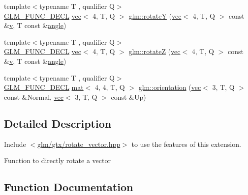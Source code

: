 \begin{DoxyCompactItemize}
\item 
{\footnotesize template$<$typename T , qualifier Q$>$ }\\\hyperlink{setup_8hpp_ab2d052de21a70539923e9bcbf6e83a51}{G\+L\+M\+\_\+\+F\+U\+N\+C\+\_\+\+D\+E\+CL} \hyperlink{structglm_1_1vec}{vec}$<$ 4, T, Q $>$ \hyperlink{group__gtx__rotate__vector_ga3ce3db0867b7f8efd878ee34f95a623b}{glm\+::rotateY} (\hyperlink{structglm_1_1vec}{vec}$<$ 4, T, Q $>$ const \&\hyperlink{_s_d_l__opengl_8h_a10a82eabcb59d2fcd74acee063775f90}{v}, T const \&\hyperlink{_s_d_l__opengl__glext_8h_a9e06c1f76a20fed54ca742cd25cb02c4}{angle})
\item 
{\footnotesize template$<$typename T , qualifier Q$>$ }\\\hyperlink{setup_8hpp_ab2d052de21a70539923e9bcbf6e83a51}{G\+L\+M\+\_\+\+F\+U\+N\+C\+\_\+\+D\+E\+CL} \hyperlink{structglm_1_1vec}{vec}$<$ 4, T, Q $>$ \hyperlink{group__gtx__rotate__vector_ga923b75c6448161053768822d880702e6}{glm\+::rotateZ} (\hyperlink{structglm_1_1vec}{vec}$<$ 4, T, Q $>$ const \&\hyperlink{_s_d_l__opengl_8h_a10a82eabcb59d2fcd74acee063775f90}{v}, T const \&\hyperlink{_s_d_l__opengl__glext_8h_a9e06c1f76a20fed54ca742cd25cb02c4}{angle})
\item 
{\footnotesize template$<$typename T , qualifier Q$>$ }\\\hyperlink{setup_8hpp_ab2d052de21a70539923e9bcbf6e83a51}{G\+L\+M\+\_\+\+F\+U\+N\+C\+\_\+\+D\+E\+CL} \hyperlink{structglm_1_1mat}{mat}$<$ 4, 4, T, Q $>$ \hyperlink{group__gtx__rotate__vector_ga1a32fceb71962e6160e8af295c91930a}{glm\+::orientation} (\hyperlink{structglm_1_1vec}{vec}$<$ 3, T, Q $>$ const \&Normal, \hyperlink{structglm_1_1vec}{vec}$<$ 3, T, Q $>$ const \&Up)
\end{DoxyCompactItemize}


\subsection{Detailed Description}
Include $<$\hyperlink{rotate__vector_8hpp}{glm/gtx/rotate\+\_\+vector.\+hpp}$>$ to use the features of this extension.

Function to directly rotate a vector 

\subsection{Function Documentation}
\mbox{\label{group__gtx__rotate__vector_ga1a32fceb71962e6160e8af295c91930a}} 
